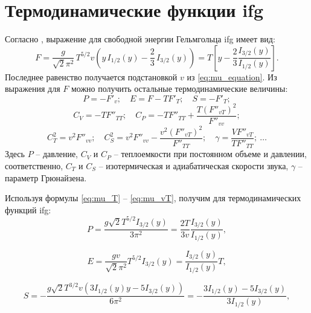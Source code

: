 \section{Термодинамические функции \texorpdfstring{\acrshort{ifg}}{ИФГ}}
Согласно \cite{kirzhnits:UFN:1975}, выражение для свободной энергии Гельмгольца \acrshort{ifg} имеет вид:
\begin{equation}
   \label{eq:helmholtz_potential}
   F = \frac{g}{\sqrt{2}\pi^2}\,  T^{5 / 2} v \left( y \, I_{1 /2} (y) - \frac{2}{3}\, I_{3 / 2} (y) \right)
   = T\left[y - \frac{2}{3}\frac{I_{3/2}(y)}{I_{1/2}(y)}\right].
\end{equation}
Последнее равенство получается подстановкой $v$ из \eqref{eq:mu_equation}.
Из выражения для $F$ можно получить остальные термодинамические величины:
\begin{equation}
    \label{eq:PES}
    P = -F'_v;\quad
    E = F - TF'_T;\quad
    S = -F'_T;
\end{equation}
\begin{equation}
    \label{eq:CVCP}
    C_V = -TF''_{TT};\quad
    C_P = -TF''_{TT} + \frac{T(F''_{vT})^2}{F''_{vv}};
\end{equation}
\begin{equation}
    \label{eq:CTCS}
    C_T^2 = v^2F''_{vv};\quad
    C_S^2 = v^2F''_{vv} - \frac{v^2(F''_{vT})^2}{F''_{TT}};\quad
    \gamma = \frac{VF''_{vT}}{TF''_{TT}};\ \ldots
\end{equation}
Здесь $P$ -- давление, $C_V$ и $C_P$ -- теплоемкости при постоянном объеме и давлении, соответственно, $C_T$ и $C_S$ -- изотермическая и адиабатическая скорости звука, $\gamma$ -- параметр Грюнайзена.

Используя формулы \eqref{eq:mu_T} -- \eqref{eq:mu_vT}, получим для термодинамических функций \acrshort{ifg}:
\begin{equation}
   \label{eq:pressure}
   P = \frac{g \sqrt{2} T^{5 /2} I_{3 / 2}(y)}{3 \pi^{2}}
   = \frac{2T}{3v}\frac{I_{3/2}(y)}{I_{1/2}(y)},
\end{equation}

\begin{equation}
   \label{eq:energy}
   E = \frac{g v}{\sqrt{2}\pi^2} T^{5 /2} I_{3 / 2}(y)
   = \frac{I_{3/2}(y)}{I_{1/2}(y)}T,
\end{equation}

\begin{equation}
   \label{eq:entropy}
   S = -\frac{g\sqrt{2} T^{3 /2} v\left(3 I_{1 / 2}(y) y-5 I_{3 / 2}(y)\right)}{6 \pi^{2}}
   = -\frac{3I_{1/2}(y) - 5I_{3/2}(y)}{3I_{1/2}(y)},
\end{equation}

